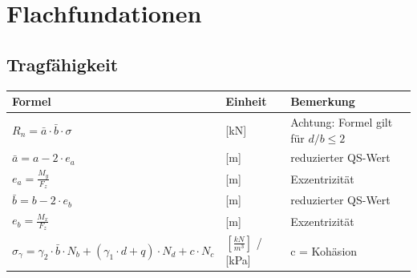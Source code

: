 \section{Flachfundationen}
\begin{minipage}{0.8\linewidth}
	\subsection{Tragfähigkeit}
		\begin{tabular}{|l|l|l|}
			\hline
			Formel			&	Einheit		&	Bemerkung \\ \hline
			
			$ R_n
			= \bar{a} \cdot \bar{b} \cdot \sigma $ & [kN] & Achtung: Formel gilt für $ d/b \leq 2 $ \\ 
			$ \bar{a}
			= a - 2 \cdot e_a $ &	[m]		& reduzierter QS-Wert	\\
			$ e_a
			= \frac{M_y}{F_z} $ &	[m]		& Exzentrizität	\\
			$ \bar{b}
			= b - 2 \cdot e_b $ &	[m]		& reduzierter QS-Wert	\\
			$ e_b
			= \frac{M_x}{F_z} $ &	[m]		& Exzentrizität	\\
			$ \sigma_{\gamma}
			= \gamma_2 \cdot \bar{b} \cdot N_b + ( \gamma_1 \cdot d + q ) \cdot N_d + c \cdot N_c $	& $ \left[\frac{kN}{m^3}\right] $ / [kPa]	&	c = Kohäsion \\		\hline

\end{tabular}
\end{minipage}
